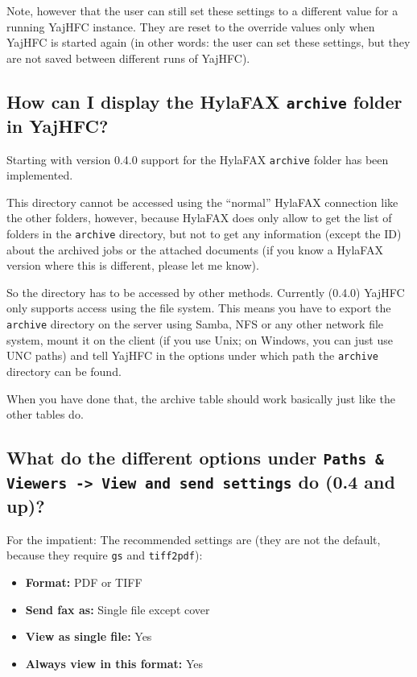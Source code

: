 \documentclass[a4paper,10pt]{scrartcl}
\begin{document}
Note, however that the user can still set these settings to a different value for a running YajHFC instance. They are reset to the override values only when YajHFC is started again (in other words: the user can set these settings, but they are not saved between different runs of YajHFC).


\subsection{How can I display the HylaFAX \texttt{archive} folder in YajHFC?}

Starting with version 0.4.0 support for the HylaFAX \texttt{archive} folder has been implemented.

This directory cannot be accessed using the "`normal"' HylaFAX connection like the other folders, however, because HylaFAX does only allow to get the list of folders in the \texttt{archive} directory, but not to get any information (except the ID) about the archived jobs or the attached documents (if you know a HylaFAX version where this is different, please let me know).

So the directory has to be accessed by other methods. Currently (0.4.0) YajHFC only supports access using the file system. This means you have to export the  \texttt{archive} directory on the server using Samba, NFS or any other network file system, mount it on the client (if you use Unix; on Windows, you can just use UNC paths) and tell YajHFC in the options under which path the \texttt{archive} directory can be found.

When you have done that, the archive table should work basically just like the other tables do.

\subsection{What do the different options under \texttt{Paths \& Viewers -> View and send settings} do (0.4 and up)?}

For the impatient: The recommended settings are (they are not the default, because they require \texttt{gs} and \texttt{tiff2pdf}):
\begin{itemize}
 \item \textbf{Format:} PDF or TIFF
 \item \textbf{Send fax as:} Single file except cover
 \item \textbf{View as single file:} Yes
 \item \textbf{Always view in this format:} Yes
\end{itemize}
\end{document}
